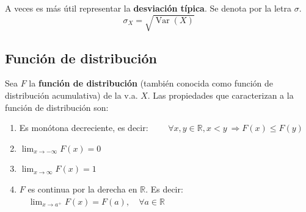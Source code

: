 \documentclass[a4paper]{book}
\numberwithin{figure}{section}
\numberwithin{equation}{subsection}
\numberwithin{figure}{chapter}
\theoremstyle{definition}
\newcommand{\rep}[3]{
	\foreach \uwu in {1,...,#2}
		{#1_{\uwu} ,}
	\, \ldots \, , #1_{#3}
}
\newcommand{\repinf}[3]{
	\foreach \uwu in {#2,...,#3}
		{#1_{\uwu} ,}
	\, \ldots
}
\DeclareMathOperator{\Var}{Var}
\begin{document}
A veces es más útil representar la \textbf{desviación típica}. Se denota por la letra $\sigma$.
\[\sigma _X = \sqrt{\Var(X)}\]

\subsection{Función de distribución}

Sea $F$ la \textbf{función de distribución} (también conocida como función de distribución acumulativa) de la v.a. $X$. Las propiedades que caracterizan a la función de distribución son:

\begin{enumerate}
	\item Es monótona decreciente, es decir: $\displaystyle{\qquad \forall x , y\in \mathbb{R}, x<y \ \Rightarrow F(x) \leq F(y)}$
	\item $\displaystyle{\lim_{x \to -\infty} F(x)=0}$
	\item $\displaystyle{\lim_{x \to \infty} F(x)=1}$
	\item $F$ es continua por la derecha en $ \mathbb{R} $. Es decir: $\displaystyle{\quad \lim_{x \to a^+} F(x)=F(a), \quad \forall a \in \mathbb{R}}$
\end{enumerate}

%
%
\end{document}
